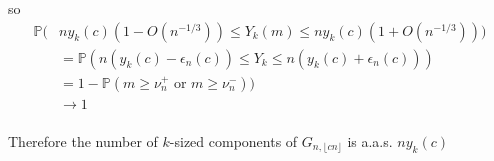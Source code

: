 so
\begin{align*}
    \mathbb{P}(&ny_{k}(c)(1 - O(n^{-1/3})) \leq  Y_{k}(m) \leq ny_{k}(c)(1 + O(n^{-1/3}))) \\
    &= \mathbb{P}(n(y_{k}(c) - \epsilon_{n}(c)) \leq  Y_{k} \leq n(y_{k}(c) + \epsilon_{n}(c))) \\
    &= 1 - \mathbb{P}(m \geq \nu_{n}^{+} \text{ or } m \geq \nu_{n}^{-})) \\
    &\to  1\\
\end{align*}

Therefore the number of \(k\)-sized components of \(G_{n, \lfloor {cn} \rfloor}\) is a.a.s. \(ny_{k}(c)\)




